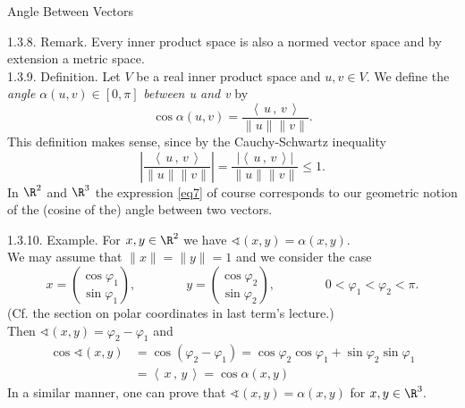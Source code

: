 \documentclass[smaller,hyperref={CJKbookmarks=true}]{beamer}
\newcommand{\scp}[2]{\left\langle\,#1\,,\,#2\,\right\rangle} \newcommand{\scpp}{\langle\,\cdot\,,\,\cdot\,\rangle}
\begin{document}
\begin{frame}{Angle Between Vectors}
\begin{spacing}{1}
\alert{1.3.8. Remark.} Every inner product space is also a normed vector space and by extension a metric space.\\[12pt]
\alert{1.3.9. Definition.} Let $V$ be a real inner product space and $u,v\in V$. We define the \emph{angle} $\alpha(u,v)\in[0,\pi]$ \emph{between u and v} by
\begin{equation}\label{eq7}
  \cos\alpha(u,v)=\frac{\scp{u}{v}}{\|u\|\|v\|}.
\end{equation}
This definition makes sense, since by the Cauchy-Schwartz inequality
\[\left|\frac{\scp{u}{v}}{\|u\|\|v\|}\right|=\frac{|\scp{u}{v}|}{\|u\|\|v\|}\leq1.\]
In $\R^2$ and $\R^3$ the expression \eqref{eq7} of course corresponds to our
geometric notion of the (cosine of the) angle between two vectors.\newpage
\end{spacing}
\begin{spacing}{1.3}
\alert{1.3.10. Example.} For $x,y\in\R^2$ we have $\sphericalangle(x,y)=\alpha(x,y).$\\
We may assume that $\|x\|=\|y\|=1$ and we consider the case
\[x=\binom{\cos\varphi_1}{\sin\varphi_1},\qquad\qquad y=\binom{\cos\varphi_2}{\sin\varphi_2},\qquad\qquad 0<\varphi_1<\varphi_2<\pi.\]
(Cf. the section on polar coordinates in last term's lecture.)\\
Then $\sphericalangle(x,y)=\varphi_2-\varphi_1$ and
\begin{align*}
  \cos\sphericalangle(x,y) &=\cos(\varphi_2-\varphi_1)=\cos\varphi_2\cos\varphi_1+\sin\varphi_2\sin\varphi_1 \\
  &=\scp{x}{y}=\cos\alpha(x,y)
\end{align*}
In a similar manner, one can prove that $\sphericalangle(x,y)=\alpha(x,y)$ for $x,y\in\R^3.$
\end{spacing}
\end{frame}
\end{document}
